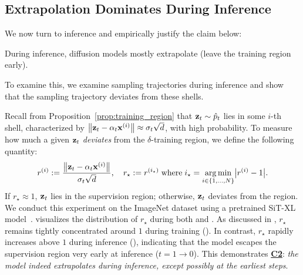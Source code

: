 \subsection{Extrapolation Dominates During Inference}
\label{sec:inference-extrapolation}
We now turn to inference and empirically justify the claim below:
\begin{claim} \label{claim:two}
During inference, diffusion models mostly extrapolate (leave the training region early).
\end{claim}
To examine this, we examine sampling trajectories during inference and show that the sampling trajectory deviates from these shells.

\begin{experiment} \label{exp:geometry-inference}
    Recall from Proposition~\ref{prop:training_region} that ${\mathbf{z}}_t \sim \hat{p}_t$ lies in some $i$-th shell, characterized by $\left\|{\mathbf{z}}_t - \alpha_t {\mathbf{x}}^{(i)}\right\| \approx \sigma_t \sqrt{d}$, with high probability. To measure how much a given ${\mathbf{z}}_t$ \emph{deviates} from the $\delta$-training region, we define the following quantity:
    \vspace{-0.2\baselineskip}
    \begin{equation} \label{eq:r_star}
        r^{(i)} := \frac{\left\| \rvz_t - \alpha_t \rvx^{(i)} \right\|}{\sigma_t \sqrt{d}},\quad  r_\star := r^{(i_\star)} \;\text{where}\; i_\star = \underset{i \in \{1, \dots, N\}}{\argmin} \big| r^{(i)} - 1 \big|.
        \vspace{-0.2\baselineskip}
    \end{equation}
    If $r_\star \approx 1$, ${\mathbf{z}}_t$ lies in the supervision region; otherwise, ${\mathbf{z}}_t$ deviates from the region. We conduct this experiment on the ImageNet dataset using a pretrained SiT-XL model~\citep{ma2024sit}.  visualizes the distribution of $r_\star$ during both  and . As discussed in , $r_\star$ remains tightly concentrated around $1$ during training (). In contrast, $r_\star$ rapidly increases above $1$ during inference (), indicating that the model escapes the supervision region very early at inference ($t = 1 \to 0$). This demonstrates \hyperref[claim:two]{\textbf{C2}}: \emph{the model indeed extrapolates during inference, except possibly at the earliest steps}.
\end{experiment}